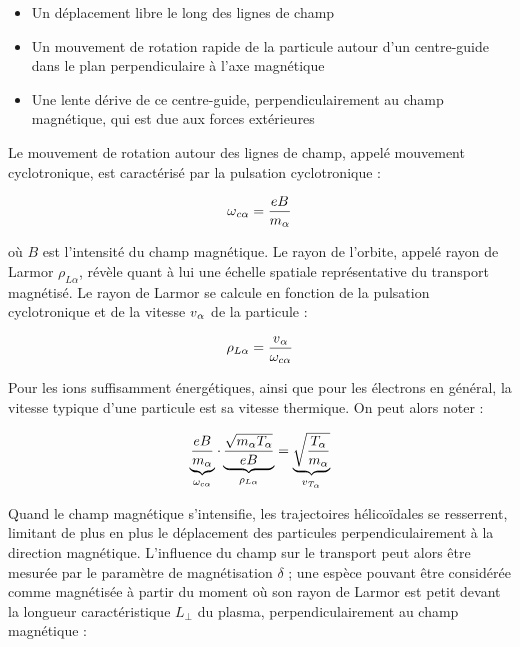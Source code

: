 \begin{refsection}
\begin{itemize}
  \item Un déplacement libre le long des lignes de champ
  \item Un mouvement de rotation rapide de la particule
  autour d'un centre-guide dans le plan perpendiculaire à l'axe magnétique
  \item Une lente dérive de ce centre-guide, perpendiculairement au champ
  magnétique, qui est due aux forces extérieures
\end{itemize}

Le mouvement de rotation autour des lignes de champ, appelé mouvement
cyclotronique, est caractérisé par la pulsation cyclotronique : 

\begin{equation}
\omega{_{{c\alpha}}}=\frac{e B}{m_\alpha}
\end{equation}

où $B$ est l'intensité du champ magnétique. Le rayon de l'orbite, appelé rayon
de Larmor $\rho_{L\alpha}$, révèle quant à lui une échelle spatiale représentative du transport magnétisé.
Le rayon de Larmor se calcule en fonction de la pulsation cyclotronique et de la vitesse
$v{_{\alpha}}$ de la particule :

\begin{equation}
\rho_{L \alpha}
=\frac{v{_{\alpha}}}{\omega_{c{\alpha}}}
\end{equation}

Pour les ions suffisamment énergétiques, ainsi que pour les électrons en général,
la vitesse typique d'une particule est sa vitesse thermique. On peut alors noter
:

\begin{equation}
\underbrace{\frac{e B}{m_\alpha}}_{\omega_{c\alpha}}
\cdot\underbrace{\frac{\sqrt{m_\alpha T_\alpha}}{eB}}_{\rho_{L\alpha}}
=\underbrace{\sqrt{\frac{T_{\alpha}}{m_{\alpha}}}}_{v{_{T_{\alpha}}}}
\end{equation}

Quand le champ magnétique s'intensifie, les trajectoires
hélicoïdales se resserrent, limitant de plus en plus le déplacement des
particules perpendiculairement à la direction magnétique. L'influence du champ
sur le transport peut alors être mesurée par le paramètre de
magnétisation $\delta$ ; une espèce pouvant être considérée comme magnétisée à
partir du moment où son rayon de
Larmor est petit devant la longueur caractéristique $L_\perp$ du plasma,
perpendiculairement au champ magnétique :


\end{refsection}
